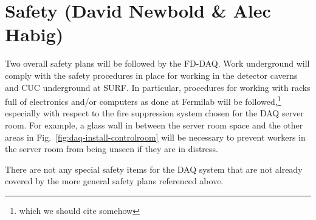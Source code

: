 

\section{Safety (David Newbold \& Alec Habig)}
\label{sec:fdsp-daq-safety}


Two overall safety plans will be followed by the FD-DAQ.  Work
underground will comply with the safety procedures in place for working
in the detector caverns and CUC underground at SURF.  In particular,
procedures for working with racks full of electronics and/or computers
as done at Fermilab will be followed,\footnote{which we should cite
  somehow}  especially with respect to the fire suppression system
chosen for the DAQ server room.  For example, a glass wall in between
the server room space and the other areas in
Fig.~\ref{fig:daq-install-controlroom} will be necessary to prevent
workers in the server room from being unseen if they are in distress.

There are not any special safety items for the DAQ system that are not
already covered by the more general safety plans referenced above. 





